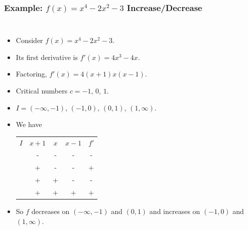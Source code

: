 \documentclass[serif,ignorenonframetext]{beamer}
\begin{document}
\begin{frame}
  \frametitle{Example: $f(x)=x^4-2x^2-3$ Increase/Decrease}
  \begin{columns}
  \begin{itemize}[<+->]
  \item Consider $f(x)=x^4-2x^2-3$.
  \item Its first derivative is $f'(x)=4x^3-4x$.
  \item Factoring, $f'(x)=4(x+1)x(x-1)$.
  \item Critical numbers $c=-1$, $0$, $1$.
  \item $I=(-\infty,-1)$, $(-1,0)$, $(0,1)$,
    $(1,\infty)$.
  \item We have
    \begin{center}
    \begin{tabular}{lcccc}
      $I$                         & $x+1$ & $x$ & $x-1$ & $f'$ \\
      \uncover<+->{$(-\infty,-1)$ & -     & -   & -     & -    \\}%
      \uncover<+->{$(-1,0)$       & +     & -   & -     & +    \\}%
      \uncover<+->{$(0,1)$        & +     & +   & -     & -    \\}%
      \uncover<+->{$(1,\infty)$   & +     & +   & +     & +      }%
    \end{tabular}
    \end{center}
  \item So $f$ decreases on $(-\infty,-1)$ and $(0,1)$ and
    increases on $(-1,0)$ and $(1,\infty)$.
  \end{itemize}

\end{columns}
\end{frame}
\end{document}
